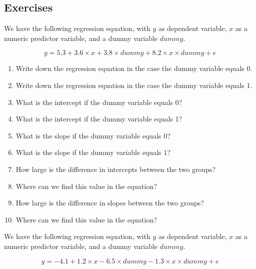 \documentclass[]{report}\usepackage[]{graphicx}\usepackage[]{color}
\begin{document}
\subsection{Exercises}




We have the following regression equation, with $y$ as dependent variable, $x$ as a numeric predictor variable, and a dummy variable $dummy$.

\begin{equation} 
y = 5.3 + 3.6  \times x + 3.8  \times dummy + 8.2  \times x  \times dummy + e \nonumber
\end{equation}
\begin{enumerate}




\item
Write down the regression equation in the case the dummy variable equals 0.

\item Write down the regression equation in the case the dummy variable equals 1.
\item What is the intercept if the dummy variable equals 0?
\item What is the intercept if the dummy variable equals 1?
\item What is the slope if the dummy variable equals 0?
\item What is the slope if the dummy variable equals 1?
\item How large is the difference in intercepts between the two groups?
\item Where can we find this value in the equation?
\item How large is the difference in slopes between the two groups?
\item Where can we find this value in the equation?

\end{enumerate}



We have the following regression equation, with $y$ as dependent variable, $x$ as a numeric predictor variable, and a dummy variable $dummy$.

\begin{equation} 
y = - 4.1 + 1.2  \times x - 6.5  \times dummy - 1.3 \times x \times dummy + e \nonumber
\end{equation}
\end{document}
